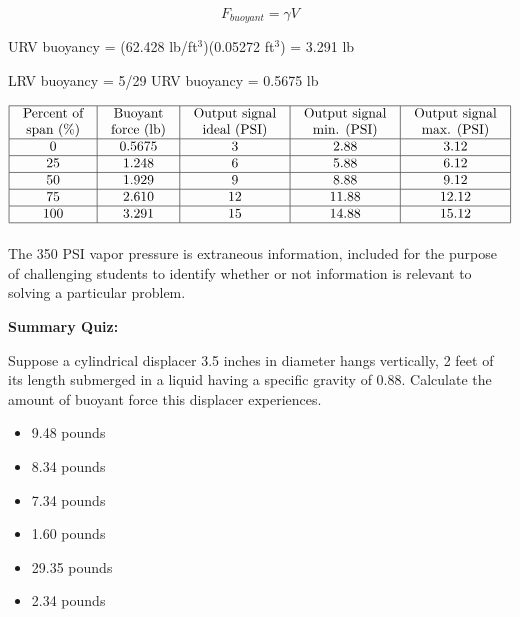 \documentclass[12pt,a4paper]{article}
\begin{document}
$$F_{buoyant} = \gamma V$$

URV buoyancy = (62.428 lb/ft$^{3}$)(0.05272 ft$^{3}$) = 3.291 lb

LRV buoyancy = 5/29 URV buoyancy = 0.5675 lb


$$\vbox{\offinterlineskip
\halign{\strut
\vrule \quad\hfil # \ \hfil & 
\vrule \quad\hfil # \ \hfil & 
\vrule \quad\hfil # \ \hfil & 
\vrule \quad\hfil # \ \hfil & 
\vrule \quad\hfil # \ \hfil \vrule \cr
\noalign{\hrule}
%
Percent of & Buoyant & Output signal & Output signal & Output signal \cr
%
span (\%) & force (lb) & ideal (PSI) & min. (PSI) & max. (PSI) \cr
%
\noalign{\hrule}
%
0 & 0.5675 & 3 & 2.88 & 3.12 \cr
%
\noalign{\hrule}
%
25 & 1.248 & 6 & 5.88 & 6.12 \cr
%
\noalign{\hrule}
%
50 & 1.929 & 9 & 8.88 & 9.12 \cr
%
\noalign{\hrule}
%
75 & 2.610 & 12 & 11.88 & 12.12 \cr
%
\noalign{\hrule}
%
100 & 3.291 & 15 & 14.88 & 15.12 \cr
%
\noalign{\hrule}
} %
}$$ %

\vskip 10pt

The 350 PSI vapor pressure is extraneous information, included for the purpose of challenging students to identify whether or not information is relevant to solving a particular problem.

















\vfil \eject

\noindent
{\bf Summary Quiz:}

Suppose a cylindrical displacer 3.5 inches in diameter hangs vertically, 2 feet of its length submerged in a liquid having a specific gravity of 0.88.  Calculate the amount of buoyant force this displacer experiences.

\begin{itemize}
\item{} 9.48 pounds
\vskip 5pt 
\item{} 8.34 pounds
\vskip 5pt 
\item{} 7.34 pounds
\vskip 5pt 
\item{} 1.60 pounds
\vskip 5pt 
\item{} 29.35 pounds
\vskip 5pt 
\item{} 2.34 pounds
\end{itemize}
\end{document}
